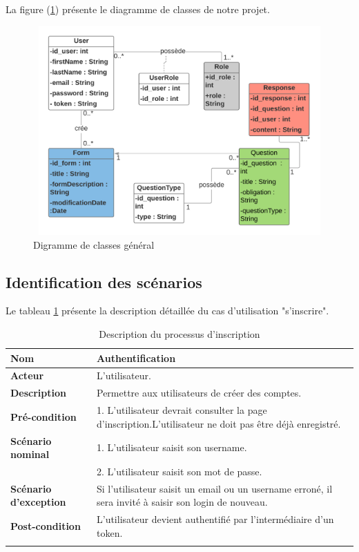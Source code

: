La figure (\ref{ClasseGeneral}) présente le diagramme de classes de notre projet.
\begin{figure}[H]
    \centering
    \includegraphics[width=14cm, height=8cm]{img/DiagClasse.png}
    \caption{Digramme de classes général}
   \label{ClasseGeneral}
\end{figure}

\subsection{Identification des scénarios}
  
Le tableau \ref{tabGererOffre} présente la description détaillée du cas d'utilisation "s'inscrire".
    \begin{longtable}{|p{4cm}|p{10.25cm}|}
	\hline
	\textbf{Nom} & Authentification\\ \hline
	\textbf{Acteur}& L'utilisateur. \\ \hline
	\textbf{Description} & Permettre aux utilisateurs de créer des comptes. \\ \hline
	\textbf{Pré-condition} & 1. L'utilisateur devrait consulter la page d'inscription.L'utilisateur ne doit pas être déjà enregistré.\\
	\hline \textbf{Scénario nominal} & 1. L'utilisateur saisit son username.\\
	& 2. L'utilisateur saisit son mot de passe.
	\\ \hline
	\textbf{Scénario d'exception} &  Si l'utilisateur saisit un email ou un username erroné, il sera invité à saisir son login de nouveau.\\ \hline
	\textbf{Post-condition} & L'utilisateur devient authentifié par l'intermédiaire d'un token.\\\hline
	\caption{ Description du processus d'inscription}\label{tabGererOffre}
	\end{longtable}
